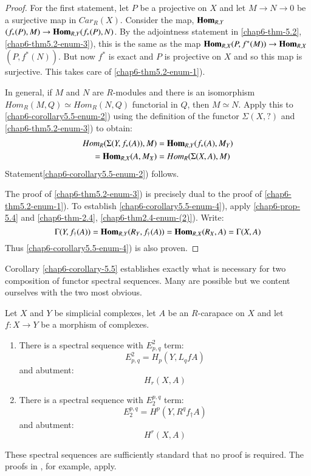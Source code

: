 \begin{proof}
For the first statement, let $P$ be a projective on $X$ and let $M \rightarrow N \rightarrow 0$ be a surjective map in $C ar_{R}(X)$. Consider the map, $\operatorname{\mathbf{Hom}}_{R, Y}$ $(f_{*}(P), M) \rightarrow \operatorname{\mathbf{Hom}}_{R,Y}(f_{*}(P), N)$. By the adjointness statement in \ref{chap6-thm-5.2}, \ref{chap6-thm5.2-enum-3}), this is the same as the map $\operatorname{\mathbf{Hom}}_{R, X}(P, f^{*}(M))\rightarrow \operatorname{\mathbf{Hom}}_{R,X}$ $(P, f^{*}(N))$. But now $f^{*}$ is exact and $P$ is projective on $X$ and so this map is surjective. This takes care of \ref{chap6-thm5.2-enum-1}).

In general, if $M$ and $N$ are $R$-modules and there is an isomorphism $Hom_{R}(M,Q) \simeq Hom_{R}(N,Q)$ functorial in $Q$, then $M \simeq N$. Apply this to \ref{chap6-corollary5.5-enum-2}) using the definition of the functor $\Sigma(X, ?)$ and
\ref{chap6-thm5.2-enum-3}) to obtain:
\begin{align*}
Hom_{R}(\Sigma(Y, f_{*}(A)), M) &= \operatorname{\mathbf{Hom}}_{R,Y}(f_{*}(A), M_{Y})\\
= \operatorname{\mathbf{Hom}}_{R,X}(A, M_{X}) &= Hom_{R}(\Sigma(X, A), M)
\end{align*}
Statement\pageoriginale \ref{chap6-corollary5.5-enum-2}) follows.

The proof of \ref{chap6-thm5.2-enum-3}) is precisely dual to the proof of \ref{chap6-thm5.2-enum-1}). To establish
\ref{chap6-corollary5.5-enum-4}), apply \ref{chap6-prop-5.4} and \ref{chap6-thm-2.4}, \ref{chap6-thm2.4-enum-(2)}). Write:
$$
\Gamma (Y, f_{\dagger}(A)) = \operatorname{\mathbf{Hom}}_{R,Y}(R_{Y}, f_{\dagger}(A)) = \operatorname{\mathbf{Hom}}_{R,X}(R_{X}, A) = \Gamma(X,A)
$$
Thus \ref{chap6-corollary5.5-enum-4}) is also proven.
\end{proof}

Corollary \ref{chap6-corollary-5.5} establishes exactly what is necessary for two composition of functor spectral sequences. Many are possible but we content ourselves with the two most obvious.


\begin{secprop}\label{chap6-prop-5.6}
Let $X$ and $Y$ be simplicial complexes, let $A$ be an $R$-carapace on $X$ and let $f:X\rightarrow Y$ be a morphism of complexes.
\begin{enumerate}[(1)]
\item There is a spectral sequence with $E_{p,q}^{2}$ term:
    $$
    E_{p,q}^{2} = H_{p}(Y, L_{q}fA)
    $$
    and abutment:
    $$
    H_{r}(X, A)
    $$
    \item There is a spectral sequence with $E_{2}^{p,q}$ term:
        $$
        E_{2}^{p, q} =H^{p}(Y, R^{q} f_{\dagger}A)
        $$
        and abutment:
        $$
        H^{r}(X, A)
        $$
\end{enumerate}

These spectral sequences are sufficiently standard that no proof is required. The proofs in \cite{chap6-keyGr}, for example, apply.
\end{secprop}

